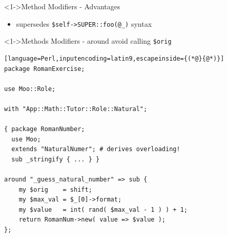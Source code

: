 \documentclass[ngerman,xcolor={table,dvipsnames},scriptsizeer,compress,hyperref={bookmarks,colorlinks}]{beamer}
\begin{document}
\begin{frame}[t,fragile]

\begin{block}<1->{Method Modifiers - Advantages}
\begin{itemize}
\item supersedes \texttt{\$self->SUPER::foo(@\_)} syntax
\end{itemize}
\end{block}

\end{frame}

\begin{frame}[fragile]

\begin{block}<1->{Methods Modifiers - around avoid calling \texttt{\$orig}}
\scriptsize
\begin{lstlisting}[language=Perl,inputencoding=latin9,escapeinside={(*@}{@*)}]
package RomanExercise;

use Moo::Role;

with "App::Math::Tutor::Role::Natural";

{ package RomanNumber;
  use Moo;
  extends "NaturalNumer"; # derives overloading!
  sub _stringify { ... } }

around "_guess_natural_number" => sub {
    my $orig    = shift;
    my $max_val = $_[0]->format;
    my $value   = int( rand( $max_val - 1 ) ) + 1;
    return RomanNum->new( value => $value );
};
\end{lstlisting}
\end{block}

\begin{itemize}
\end{itemize}

\end{frame}
\end{document}
